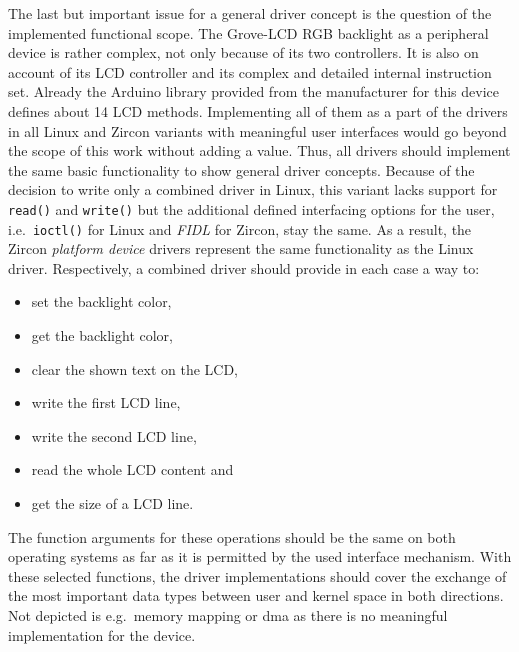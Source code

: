 The last but important issue for a general driver concept is the question of the implemented functional scope.
The Grove-LCD RGB backlight as a peripheral device is rather complex, not only because of its two controllers.
It is also on account of its LCD controller and its complex and detailed internal instruction set.
Already the Arduino library provided from the manufacturer for this device defines about 14 LCD methods.
Implementing all of them as a part of the drivers in all Linux and Zircon variants with meaningful user interfaces would go beyond the scope of this work without adding a value.
Thus, all drivers should implement the same basic functionality to show general driver concepts.
Because of the decision to write only a combined driver in Linux, this variant lacks support for \texttt{read()} and \texttt{write()} but the additional defined interfacing options for the user, i.e.\ \texttt{ioctl()} for Linux and \textit{FIDL} for Zircon, stay the same.
As a result, the Zircon \textit{platform device} drivers represent the same functionality as the Linux driver.
Respectively, a combined driver should provide in each case a way to:
\begin{itemize}
    \item set the backlight color,
    \item get the backlight color,
    \item clear the shown text on the LCD,
    \item write the first LCD line,
    \item write the second LCD line,
    \item read the whole LCD content and
    \item get the size of a LCD line.
\end{itemize}
The function arguments for these operations should be the same on both operating systems as far as it is permitted by the used interface mechanism.
With these selected functions, the driver implementations should cover the exchange of the most important data types between user and kernel space in both directions.
Not depicted is e.g.\ memory mapping or \ac{dma} as there is no meaningful implementation for the device.


